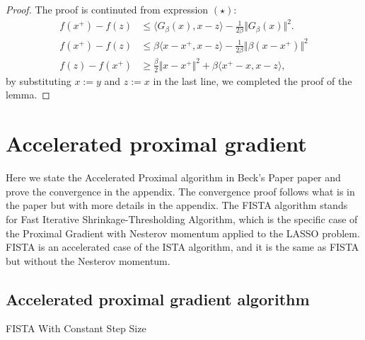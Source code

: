 \documentclass[]{article}
\theoremstyle{definition}
\begin{document}
        \begin{proof}
            The proof is continuted from expression $(\star)$: 
            \begin{align*}
                f(x^+) - f(z) 
                &\le 
                \langle G_\beta(x), x - z\rangle - \frac{1}{2\beta}\Vert G_\beta(x)\Vert^2. 
                \\
                f(x^+) - f(z) & \le 
                \beta\langle x - x^+, x - z\rangle - \frac{1}{2\beta}\Vert \beta (x - x^+)\Vert^2
                \\
                f(z) - f(x^+) & \ge
                \frac{\beta}{2}\Vert x - x^+\Vert^2
                 + 
                \beta\langle x^+ - x, x - z\rangle, 
            \end{align*}
            by substituting $x:=y$ and $z:= x$ in the last line, we completed the proof of the lemma. 
        \end{proof}

\section{Accelerated proximal gradient}\label{sec:apg_intro}
    Here we state the Accelerated Proximal algorithm in Beck's Paper paper\cite{paper:FISTA} and prove the convergence in the appendix. The convergence proof follows what is in the paper but with more details in the appendix. The FISTA algorithm stands for Fast Iterative Shrinkage-Thresholding Algorithm, which is the specific case of the Proximal Gradient with Nesterov momentum applied to the LASSO problem. FISTA is an accelerated case of the ISTA algorithm, and it is the same as FISTA but without the Nesterov momentum. 
    
    \subsection{Accelerated proximal gradient algorithm} 
        \begin{algorithm}[H]\label{alg:fista_1} 
        \begin{algorithmic}[1]
                \ENDIF
            \ENDFOR
        \end{algorithmic}\caption{FISTA With Constant Step Size}
        \end{algorithm}
\end{document}
